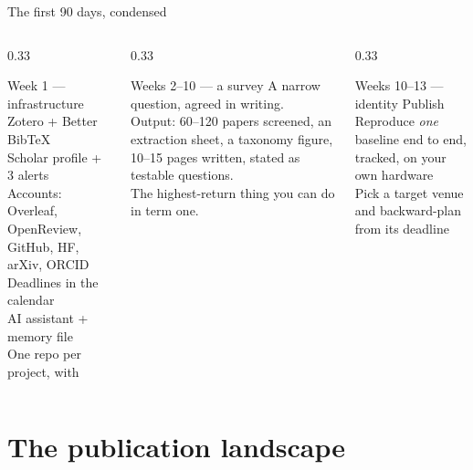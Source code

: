\documentclass[aspectratio=169,11pt]{beamer}
\begin{document}
\begin{frame}{The first 90 days, condensed}
\begin{columns}[T]
\begin{column}{0.33\textwidth}
\begin{block}{Week 1 --- infrastructure}
\scriptsize
Zotero + Better BibTeX\\
Scholar profile + 3 alerts\\
Accounts: Overleaf, OpenReview, GitHub, HF, arXiv, ORCID\\
Deadlines in the calendar\\
AI assistant + memory file\\
One repo per project, with 
\end{block}
\end{column}
\begin{column}{0.33\textwidth}
\begin{block}{Weeks 2--10 --- a survey}
\scriptsize
A narrow question, agreed in writing.\\[4pt]
Output: 60--120 papers screened, an extraction sheet, a taxonomy figure,
10--15 pages written,  stated as testable questions.\\[4pt]
The highest-return thing you can do in term one.
\end{block}
\end{column}
\begin{column}{0.33\textwidth}
\begin{block}{Weeks 10--13 --- identity}
\scriptsize
Publish \\[4pt]
Reproduce \emph{one} baseline end to end, tracked, on your own hardware\\[4pt]
Pick a target venue and backward-plan from its deadline
\end{block}
\end{column}
\end{columns}
\end{frame}

\section{The publication landscape}
\end{document}
